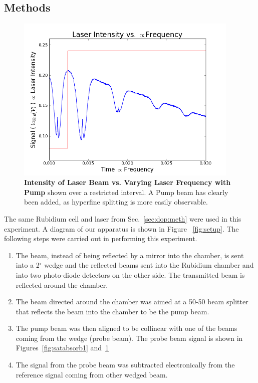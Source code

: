 \documentclass[paper=a4, fontsize=11pt]{scrartcl} %
\numberwithin{equation}{section}
\numberwithin{figure}{section}
\numberwithin{table}{section}
\begin{document}
\subsection{Methods}
\label{sec:satabmeth}
\begin{figure}[h] \begin{center}
  \includegraphics[height=80mm]{2-2-002-zoom.png}
  \caption{\textbf{Intensity of Laser Beam vs. Varying Laser Frequency with Pump} shown over a restricted interval. A Pump beam has clearly been added, as hyperfine splitting is more easily observable. }
  \label{fig:withPump_1}
\end{center} \end{figure}
The same Rubidium cell and laser from Sec.~\ref{sec:dop:meth} were
used in this experiment. A diagram of our apparatus is shown in Figure
~\ref{fig:setup}. The following steps were carried out in performing
this experiment. 
\begin{enumerate}
\item The beam, instead of being reflected by a mirror into the
  chamber, is sent into a 2$^\circ$ wedge and the reflected beams sent
  into the Rubidium chamber and into two photo-diode detectors on the
  other side. The transmitted beam is reflected around
  the chamber.
\item The beam directed around the chamber was aimed at a 50-50 beam
  splitter that reflects the beam into the chamber to be the pump beam.
\item The pump beam was then aligned to be collinear with one of the
  beams coming from the wedge (probe beam). The probe beam signal is
  shown in Figures~\ref{fig:satabsorb1} and~\ref{fig:withPump_1}
\item The signal from the probe beam was subtracted electronically
  from the reference signal coming from other wedged beam. 
\end{enumerate}
\end{document}
